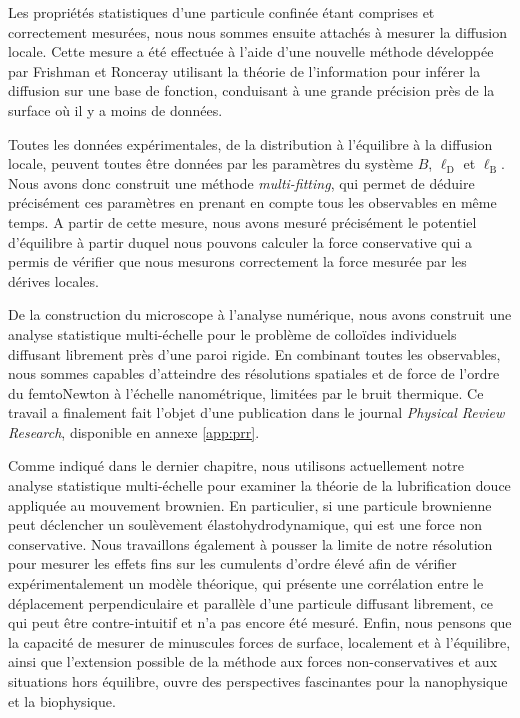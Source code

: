 Les propriétés statistiques d'une particule confinée étant comprises et correctement mesurées, nous nous sommes ensuite attachés à mesurer la diffusion locale. Cette mesure a été effectuée à l'aide d'une nouvelle méthode développée par Frishman et Ronceray \cite{frishman_learning_2020} utilisant la théorie de l'information pour inférer la diffusion sur une base de fonction, conduisant à une grande précision près de la surface où il y a moins de données. 

Toutes les données expérimentales, de la distribution à l'équilibre à la diffusion locale, peuvent toutes être données par les paramètres du système $B$, $\ell _\mathrm{D}$ et $\ell_\mathrm{B}$. Nous avons donc construit une méthode \textit{multi-fitting}, qui permet de déduire précisément ces paramètres en prenant en compte tous les observables en même temps. A partir de cette mesure, nous avons mesuré précisément le potentiel d'équilibre à partir duquel nous pouvons calculer la force conservative qui a permis de vérifier que nous mesurons correctement la force mesurée par les dérives locales.

De la construction du microscope à l'analyse numérique, nous avons construit une analyse statistique multi-échelle pour le problème de colloïdes individuels diffusant librement près d'une paroi rigide. En combinant toutes les observables, nous sommes capables d'atteindre des résolutions spatiales et de force de l'ordre du femtoNewton à l'échelle nanométrique, limitées par le bruit thermique. Ce travail a finalement fait l'objet d'une publication dans le journal \textit{Physical Review Research}, disponible en annexe \ref{app:prr}.

Comme indiqué dans le dernier chapitre, nous utilisons actuellement notre analyse statistique multi-échelle pour examiner la théorie de la lubrification douce appliquée au mouvement brownien. En particulier, si une particule brownienne peut déclencher un soulèvement élastohydrodynamique, qui est une force non conservative. Nous travaillons également à pousser la limite de notre résolution pour mesurer les effets fins sur les cumulents d'ordre élevé afin de vérifier expérimentalement un modèle théorique, qui présente une corrélation entre le déplacement perpendiculaire et parallèle d'une particule diffusant librement, ce qui peut être contre-intuitif et n'a pas encore été mesuré. Enfin, nous pensons que la capacité de mesurer de minuscules forces de surface, localement et à l'équilibre, ainsi que l'extension possible de la méthode aux forces non-conservatives et aux situations hors équilibre, ouvre des perspectives fascinantes pour la nanophysique et la biophysique.

